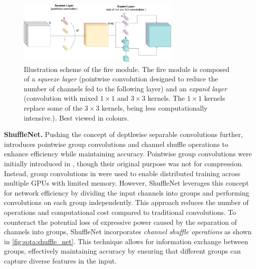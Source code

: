 \begin{figure}[htbp]
  \centering
  \includegraphics[width=0.70\textwidth]{chapter_sota/assets/fire_module.pdf}
  \caption{Illustration scheme of the fire module. The fire module is composed
    of a \emph{squeeze layer} (pointwise convolution designed to reduce the
    number of channels fed to the following layer) and an \emph{expand layer}
    (convolution with mixed $1\times1$ and $3\times3$ kernels. The $1\times1$
    kernels replace some of the $3\times3$ kernels, being less computationally
    intensive.). Best viewed in colours.}
  \label{fig:sota:fire_module}
\end{figure}



\noindent\textbf{ShuffleNet.} Pushing the concept of depthwise separable convolutions further,
\cite{ZhangShuffleNet} introduces pointwise group convolutions and channel
shuffle operations to enhance efficiency while maintaining accuracy. Pointwise
group convolutions were initially introduced in
\cite{DBLP:conf/nips/KrizhevskySH12}, though their original purpose was not for
compression. Instead, group convolutions in \cite{DBLP:conf/nips/KrizhevskySH12}
were used to enable distributed training across multiple \acp{GPU} with limited
memory. However, ShuffleNet \cite{ZhangShuffleNet} leverages this concept for
network efficiency by dividing the input channels into groups and performing
convolutions on each group independently. This approach reduces the number of
operations and computational cost compared to traditional convolutions. To
counteract the potential loss of expressive power caused by the separation of
channels into groups, ShuffleNet incorporates \emph{channel shuffle operations}
as shown in \cref{fig:sota:shuffle_net}. This technique allows for information
exchange between groups, effectively maintaining accuracy by ensuring that
different groups can capture diverse features in the input.\\

